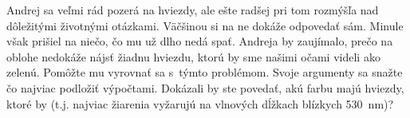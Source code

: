 Andrej sa veľmi rád pozerá na hviezdy, ale ešte radšej pri tom rozmýšľa nad dôležitými životnými otázkami.
Väčšinou si na ne dokáže odpovedať sám. Minule však prišiel na niečo, čo mu už dlho nedá spať.
Andreja by zaujímalo, prečo na oblohe nedokáže nájsť žiadnu hviezdu, ktorú by sme našimi očami videli ako zelenú.
Pomôžte mu vyrovnať sa s~týmto problémom. Svoje argumenty sa snažte čo najviac podložiť výpočtami.
Dokázali by ste povedať, akú farbu majú hviezdy, ktoré by 
(t.j. najviac žiarenia vyžarujú na vlnových dĺžkach blízkych \SI{530}{\nano\metre})?
